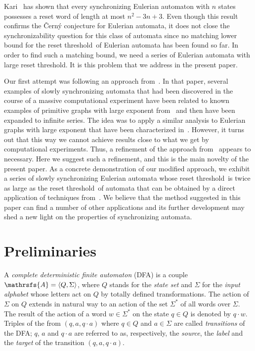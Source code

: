 \documentclass[11pt]{llncs}
\newcommand{\reth}{reset threshold}
\begin{document}
Kari~\cite{Ka03} has shown that every synchronizing Eulerian automaton with $n$
states possesses a reset word of length at most $n^2 -3n + 3$. Even though this
result confirms the \v{C}ern\'{y} conjecture for Eulerian automata, it does not
close the synchronizability question for this class of automata since no
matching lower bound for the \reth\ of Eulerian automata has been found so far.
In order to find such a matching bound, we need a series of Eulerian automata
with large \reth. It is this problem that we address in the present paper.

Our first attempt was following an approach from~\cite{AGV}. In that paper,
several examples of slowly synchronizing automata that had been discovered in
the course of a massive computational experiment have been related to known
examples of primitive graphs with large exponent from~\cite{DM64} and then have
been expanded to infinite series. The idea was to apply a similar analysis to
Eulerian graphs with large exponent that have been characterized
in~\cite{Shen00}. However, it turns out that this way we cannot achieve results
close to what we get by computational experiments. Thus, a refinement of the
approach from~\cite{AGV} appears to necessary. Here we suggest such a
refinement, and this is the main novelty of the present paper. As a concrete
demonstration of our modified approach, we exhibit a series of slowly
synchronizing Eulerian automata whose \reth\ is twice as large as the \reth\ of
automata that can be obtained by a direct application of techniques
from~\cite{AGV}. We believe that the method suggested in this paper can find a
number of other applications and its further development may shed a new light
on the properties of synchronizing automata.


\section{Preliminaries}
\label{preliminaries}
A \emph{complete deterministic finite automaton} (DFA) is
a couple $\mathrsfs{A}=\langle Q,\Sigma\rangle$, where $Q$ stands for the
\emph{state set} and $\Sigma$ for the \emph{input alphabet} whose letters act
on $Q$ by totally defined transformations. The action of $\Sigma$ on $Q$
extends in natural way to an action of the set $\Sigma^*$ of all words over
$\Sigma$. The result of the action of a word $w \in \Sigma^*$ on the state $q
\in Q$ is denoted by $q \cdot w$. Triples of the from $(q,a,q\cdot a)$ where
$q\in Q$ and $a\in\Sigma$ are called \emph{transitions} of the DFA; $q$, $a$
and $q\cdot a$ are referred to as, respectively, the \emph{source}, the
\emph{label} and the \emph{target} of the transition $(q,a,q\cdot a)$.
\end{document}
